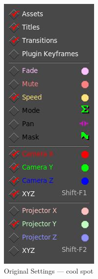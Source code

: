 \begin{figure}[htpb]
\begin{minipage}{.29\linewidth}
        \caption{Original Settings --- cool spot}
        \label{fig:overlays_list1}
    \end{minipage}
    \hfill
    \begin{minipage}{.29\linewidth}
        \centering
        \includegraphics[width=0.99\linewidth]{images/overlays_list1.png}

\end{minipage}
\end{figure}
